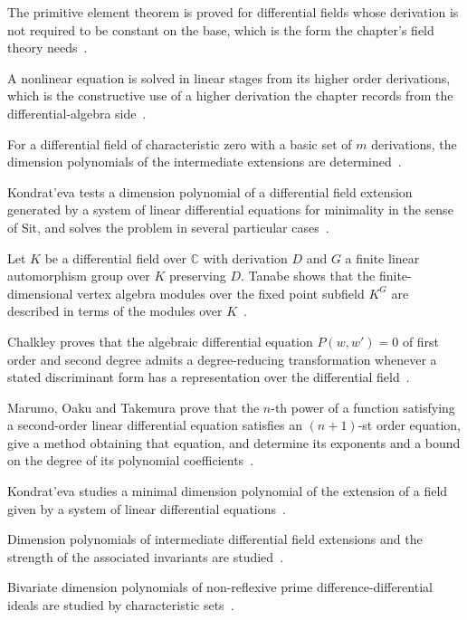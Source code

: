 The primitive element theorem is proved for differential fields whose derivation is not required to be constant on the base, which is the form the chapter's field theory needs~\cite{WlThePrimitiveElementTheoremForD2015}.

A nonlinear equation is solved in linear stages from its higher order derivations, which is the constructive use of a higher derivation the chapter records from the differential-algebra side~\cite{WlSolvingNonlinearEquationsFromH1990}.

For a differential field of characteristic zero with a basic set of $m$ derivations, the dimension polynomials of the intermediate extensions are determined~\cite{WlDimensionPolynomialsOfIntermed2020}.

Kondrat'eva tests a dimension polynomial of a differential field extension generated by a system of linear differential equations for minimality in the sense of Sit, and solves the problem in several particular cases~\cite{WlAMinimalDimensionPolynomialOfA1989}.

Let $K$ be a differential field over $\mathbb{C}$ with derivation $D$ and $G$ a finite linear automorphism group over $K$ preserving $D$. Tanabe shows that the finite-dimensional vertex algebra modules over the fixed point subfield $K^G$ are described in terms of the modules over $K$~\cite{WlFiniteDimensionalVertexAlgebra2012}.

Chalkley proves that the algebraic differential equation $P(w,w')=0$ of first order and second degree admits a degree-reducing transformation whenever a stated discriminant form has a representation over the differential field~\cite{WlAlgebraicDifferentialEquations1975}.

Marumo, Oaku and Takemura prove that the $n$-th power of a function satisfying a second-order linear differential equation satisfies an $(n+1)$-st order equation, give a method obtaining that equation, and determine its exponents and a bound on the degree of its polynomial coefficients~\cite{WlPropertiesOfPowersOfFunctionsS2015}.

Kondrat'eva studies a minimal dimension polynomial of the extension of a field given by a system of linear differential equations~\cite{WlAMinimalDimensionPolynomialOfT2020}.

Dimension polynomials of intermediate differential field extensions and the strength of the associated invariants are studied~\cite{WlDimensionPolynomialsOfIntermed2020}.

Bivariate dimension polynomials of non-reflexive prime difference-differential ideals are studied by characteristic sets~\cite{WlBivariateDimensionPolynomialsO2020}.

